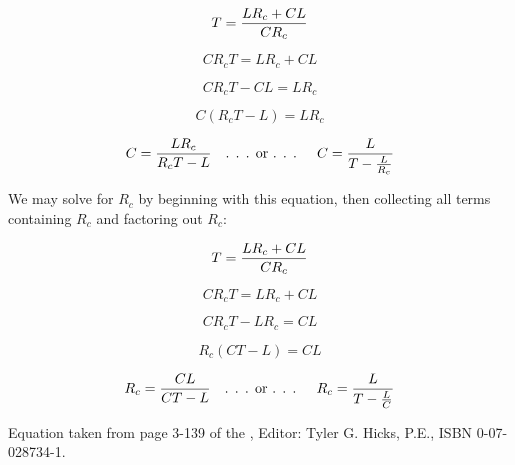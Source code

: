 $$T = {{L R_c + C L} \over C R_c}$$

$$C R_c T = L R_c + C L$$

$$C R_c T - CL = L R_c$$

$$C (R_c T - L) = L R_c$$

$$C = {{L R_c} \over {R_c T} - L} \hbox{\hskip 10pt . . . or . . . \hskip 10pt} C = {L \over T - {L \over R_c}}$$

\vskip 20pt

We may solve for $R_c$ by beginning with this equation, then collecting all terms containing $R_c$ and factoring out $R_c$:

$$T = {{L R_c + C L} \over C R_c}$$

$$C R_c T = L R_c + C L$$

$$C R_c T - L R_c = C L$$

$$R_c (CT - L) = C L$$

$$R_c = {CL \over {CT - L}} \hbox{\hskip 10pt . . . or . . . \hskip 10pt} R_c = {L \over T - {L \over C}}$$

\vskip 10pt

Equation taken from page 3-139 of the , Editor: Tyler G. Hicks, P.E., ISBN 0-07-028734-1.




